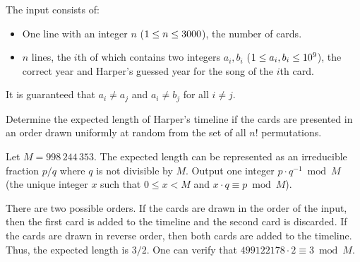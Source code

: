 \begin{Input}
    The input consists of:
    \begin{itemize}
        \item One line with an integer $n$ ($1 \le n \le 3000$), the number of cards.
        \item $n$ lines, the $i$th of which contains two integers $a_i, b_i$ ($1 \le a_i, b_i \le 10^9$), the correct year and Harper's guessed year for the song of the $i$th card.
    \end{itemize}
    It is guaranteed that $a_i \ne a_j$ and $a_i \ne b_j$ for all $i \ne j$.
\end{Input}

\begin{Output}
    Determine the expected length of Harper's timeline if the cards are presented in an order drawn uniformly at random from the set of all $n!$ permutations.

    Let $M = 998\,244\,353$.
    The expected length can be represented as an irreducible fraction $p / q$ where $q$ is not divisible by $M$.
    Output one integer $p \cdot q^{-1} \bmod M$ (the unique integer $x$ such that $0 \le x < M$ and $x \cdot q \equiv p \bmod M$).
\end{Output}

\nextsample

There are two possible orders.
If the cards are drawn in the order of the input, then the first card is added to the timeline and the second card is discarded.
If the cards are drawn in reverse order, then both cards are added to the timeline.
Thus, the expected length is $3/2$.
One can verify that $499122178 \cdot 2 \equiv 3 \bmod M$.
